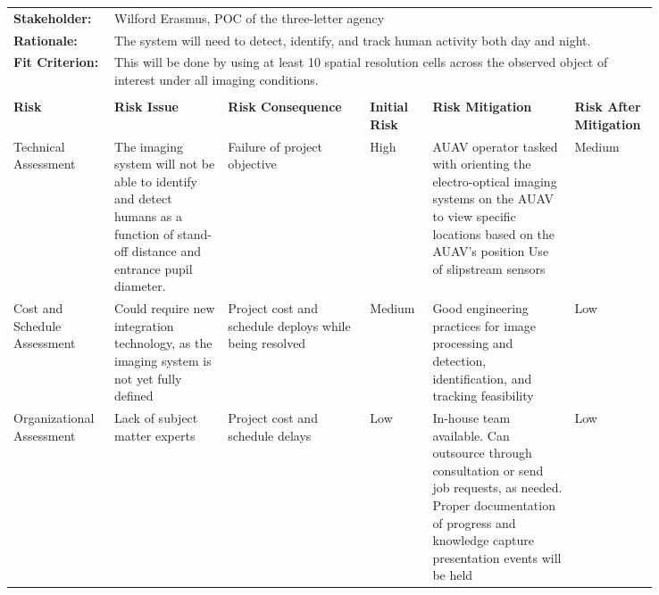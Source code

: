 \begin{landscape}
{\fontsize{8pt}{8pt}\selectfont
\begin{longtable}{| p{0.12\linewidth} | p{0.16\linewidth} |  p{0.20\linewidth} | p{0.08\linewidth} | p{0.20\linewidth} | p{0.08\linewidth} |}
	\hline \endlastfoot
	
	\hline
	\rowcolor[gray]{0.8}
	\multicolumn{6}{|c|}{ } \\
	\hline
	\textbf{Stakeholder:} & \multicolumn{5}{|l|}{Wilford Erasmus, POC of the three-letter agency} \\
	\hline
	\textbf{Rationale:} & \multicolumn{5}{|l|}{The system will need to detect, identify, and track human activity both day and night.} \\
	\hline
	\textbf{Fit Criterion:} & \multicolumn{5}{|p{0.8\linewidth}|}{This will be done by using at least 10 spatial resolution cells across the observed object of interest under all imaging conditions.} \\
	\hline
	\rowcolor[gray]{0.8}
	\multicolumn{6}{|c|}{ } \\
	\hline
	\textbf{Risk} & \textbf{Risk Issue} & \textbf{Risk Consequence} & \textbf{Initial Risk} & \textbf{Risk Mitigation} & \textbf{Risk \newline After \newline Mitigation} \\
	\hline
	Technical \newline Assessment & The imaging system will not be able to identify and detect humans as a function of stand-off distance and entrance pupil diameter. & Failure of project objective & \cellcolor{red} High & AUAV operator tasked with orienting the electro-optical imaging systems on the AUAV to view specific locations based on the AUAV's position \newline Use of slipstream sensors & \cellcolor{yellow} Medium \\
	\hline
	Cost and Schedule \newline Assessment & Could require new integration technology, as the imaging system is not yet fully defined & Project cost and schedule deploys while being resolved & \cellcolor{yellow} Medium & Good engineering practices for image processing and detection, identification, and tracking feasibility & \cellcolor{green} Low \\
	\hline
	Organizational Assessment & Lack of subject matter experts & Project cost and schedule delays & \cellcolor{green} Low & In-house team available. \newline Can outsource through consultation or send job requests, as needed. \newline Proper documentation of progress and knowledge capture presentation events will be held & \cellcolor{green} Low \\

\end{longtable}}
\end{landscape}
